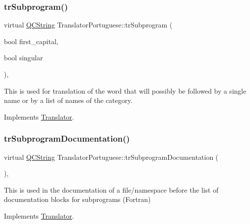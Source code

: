 \mbox{\label{class_translator_portuguese_aabd1229a0c0c935ba7703e0e52ac303a}} 
\subsubsection{\texorpdfstring{trSubprogram()}{trSubprogram()}}
{\footnotesize\ttfamily virtual \mbox{\hyperlink{class_q_c_string}{Q\+C\+String}} Translator\+Portuguese\+::tr\+Subprogram (\begin{DoxyParamCaption}\item[{bool}]{first\+\_\+capital,  }\item[{bool}]{singular }\end{DoxyParamCaption})\hspace{0.3cm}{\ttfamily [inline]}, {\ttfamily [virtual]}}

This is used for translation of the word that will possibly be followed by a single name or by a list of names of the category. 

Implements \mbox{\hyperlink{class_translator}{Translator}}.

\mbox{\label{class_translator_portuguese_a84b625f6d42d7cfa631345c400d13ed5}} 
\subsubsection{\texorpdfstring{trSubprogramDocumentation()}{trSubprogramDocumentation()}}
{\footnotesize\ttfamily virtual \mbox{\hyperlink{class_q_c_string}{Q\+C\+String}} Translator\+Portuguese\+::tr\+Subprogram\+Documentation (\begin{DoxyParamCaption}{ }\end{DoxyParamCaption})\hspace{0.3cm}{\ttfamily [inline]}, {\ttfamily [virtual]}}

This is used in the documentation of a file/namespace before the list of documentation blocks for subprograms (Fortran) 

Implements \mbox{\hyperlink{class_translator}{Translator}}.

